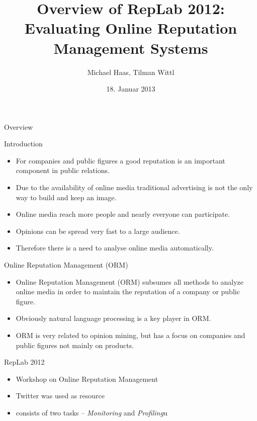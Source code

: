 \documentclass[12pt,a4paper]{beamer}
\author{Michael Haas, Tilman Wittl}
\title{Overview of RepLab 2012: Evaluating Online
Reputation Management Systems
}
\date{18. Januar 2013}
\begin{document}
\begin{frame}
\maketitle
\end{frame}

\begin{frame}{Overview}

\end{frame}

\begin{frame}{Introduction}
\begin{itemize}
\item For companies and public figures a good reputation is an important component in public relations.
\item Due to the availability of online media traditional advertising is not the only way to build and keep an image.
\item Online media reach more people and nearly everyone can participate.
\item Opinions can be spread very fast to a large audience.
\item Therefore there is a need to analyse online media automatically.
\end{itemize}
\end{frame}
\begin{frame}{Online Reputation Management (ORM)}
\begin{itemize}
\item Online Reputation Management (ORM) subsumes all methods to analyze online media in order to maintain the reputation of a company or public figure.
\item Obviously natural language processing is a key player in ORM.
\item ORM is very related to opinion mining, but has a focus on companies and public figures not mainly on products.
\end{itemize}
\end{frame}

\begin{frame}{RepLab 2012}
\begin{itemize}
\item Workshop on Online Reputation Management
\item Twitter was used as resource
\item consists of two tasks -- \textit{Monitoring} and \textit{Profiling}u
\end{itemize}
\end{frame}
\end{document}
